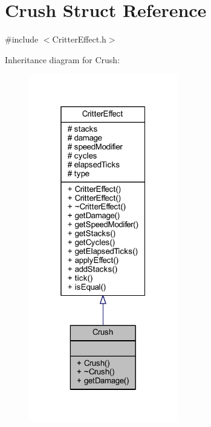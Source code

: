 \hypertarget{struct_crush}{\section{Crush Struct Reference}
\label{struct_crush}
}


{\ttfamily \#include $<$Critter\+Effect.\+h$>$}



Inheritance diagram for Crush\+:\nopagebreak
\begin{figure}[H]
\begin{center}
\leavevmode
\includegraphics[width=184pt]{struct_crush__inherit__graph}
\end{center}
\end{figure}


